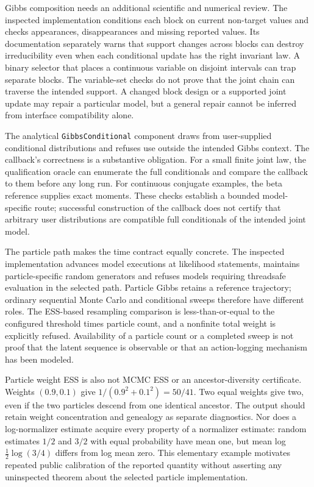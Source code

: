 Gibbs composition needs an additional scientific and numerical review. The inspected implementation conditions each block on current non-target values and checks appearances, disappearances and missing reported values. Its documentation separately warns that support changes across blocks can destroy irreducibility even when each conditional update has the right invariant law. A binary selector that places a continuous variable on disjoint intervals can trap separate blocks. The variable-set checks do not prove that the joint chain can traverse the intended support. A changed block design or a supported joint update may repair a particular model, but a general repair cannot be inferred from interface compatibility alone.~\citep{exec25_bsw_turing}

The analytical \texttt{GibbsConditional} component draws from user-supplied conditional distributions and refuses use outside the intended Gibbs context. The callback's correctness is a substantive obligation. For a small finite joint law, the qualification oracle can enumerate the full conditionals and compare the callback to them before any long run. For continuous conjugate examples, the beta reference supplies exact moments. These checks establish a bounded model-specific route; successful construction of the callback does not certify that arbitrary user distributions are compatible full conditionals of the intended joint model.~\citep{exec25_bsw_turing,exec25_bsw_choice}

The particle path makes the time contract equally concrete. The inspected implementation advances model executions at likelihood statements, maintains particle-specific random generators and refuses models requiring threadsafe evaluation in the selected path. Particle Gibbs retains a reference trajectory; ordinary sequential Monte Carlo and conditional sweeps therefore have different roles. The ESS-based resampling comparison is less-than-or-equal to the configured threshold times particle count, and a nonfinite total weight is explicitly refused. Availability of a particle count or a completed sweep is not proof that the latent sequence is observable or that an action-logging mechanism has been modeled.~\citep{exec25_bsw_turing}

Particle weight ESS is also not MCMC ESS or an ancestor-diversity certificate. Weights $(0.9,0.1)$ give $1/(0.9^2+0.1^2)=50/41$. Two equal weights give two, even if the two particles descend from one identical ancestor. The output should retain weight concentration and genealogy as separate diagnostics. Nor does a log-normalizer estimate acquire every property of a normalizer estimate: random estimates $1/2$ and $3/2$ with equal probability have mean one, but mean log $\tfrac12\log(3/4)$ differs from log mean zero. This elementary example motivates repeated public calibration of the reported quantity without asserting any uninspected theorem about the selected particle implementation.~\citep{exec25_bsw_turing,exec25_bsw_choice}

